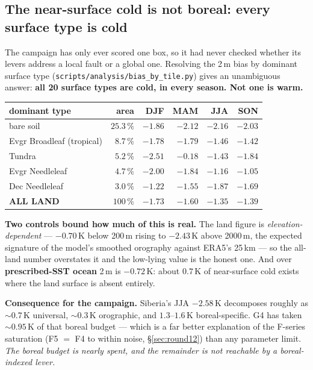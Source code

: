 \documentclass[10pt]{article}
\begin{document}
\subsection{The near-surface cold is not boreal: every surface type is cold}\label{sub:tilebias}
The campaign has only ever scored one box, so it had never checked whether its levers address a
local fault or a global one. Resolving the 2\,m bias by dominant surface type
(\texttt{scripts/analysis/bias\_by\_tile.py}) gives an unambiguous answer:
\textbf{all 20 surface types are cold, in every season. Not one is warm.}

\begin{center}\footnotesize
\begin{tabular}{l r r r r r}
\toprule
dominant type & area & DJF & MAM & JJA & SON \\
\midrule
bare soil & $25.3\,\%$ & $-1.86$ & $-2.12$ & $-2.16$ & $-2.03$ \\
Evgr Broadleaf (tropical) & $8.7\,\%$ & $-1.78$ & $-1.79$ & $-1.46$ & $-1.42$ \\
Tundra & $5.2\,\%$ & $-2.51$ & $-0.18$ & $-1.43$ & $-1.84$ \\
Evgr Needleleaf & $4.7\,\%$ & $-2.00$ & $-1.84$ & $-1.16$ & $-1.05$ \\
Dec Needleleaf & $3.0\,\%$ & $-1.22$ & $-1.55$ & $-1.87$ & $-1.69$ \\
\midrule
\textbf{ALL LAND} & $100\,\%$ & $\mathbf{-1.73}$ & $\mathbf{-1.60}$ & $\mathbf{-1.35}$ & $\mathbf{-1.39}$ \\
\bottomrule
\end{tabular}
\end{center}

\noindent \textbf{Two controls bound how much of this is real.} The land figure is
\emph{elevation-dependent} --- $-0.70$\,K below 200\,m rising to $-2.43$\,K above 2000\,m, the
expected signature of the model's smoothed orography against ERA5's 25\,km --- so the all-land
number overstates it and the low-lying value is the honest one. And over \textbf{prescribed-SST
ocean} 2\,m is $-0.72$\,K: about $0.7$\,K of near-surface cold exists where the land surface is
absent entirely.

\textbf{Consequence for the campaign.} Siberia's JJA $-2.58$\,K decomposes roughly as
${\sim}0.7$\,K universal, ${\sim}0.3$\,K orographic, and $1.3$--$1.6$\,K boreal-specific. G4 has
taken ${\sim}0.95$\,K of that boreal budget --- which is a far better explanation of the
F-series saturation (F5 $=$ F4 to within noise, \S\ref{sec:round12}) than any parameter limit.
\emph{The boreal budget is nearly spent, and the remainder is not reachable by a
boreal-indexed lever.}
\end{document}

